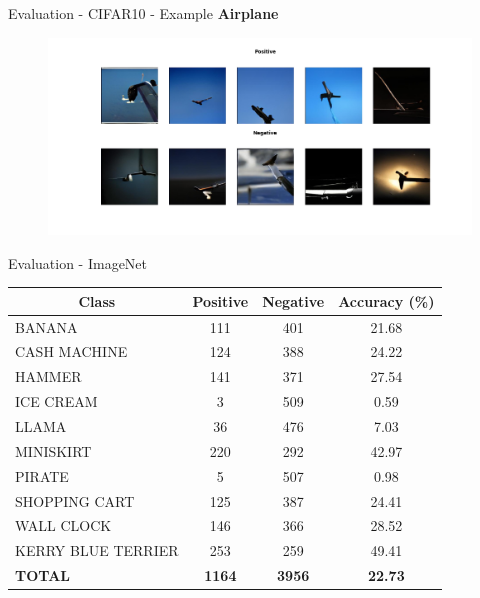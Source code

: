 \documentclass[t]{beamer}
\begin{document}
\begin{frame}[c]{Evaluation - CIFAR10 - Example}
\textbf{Airplane}
\begin{figure}
    \centering
    \includegraphics[scale=0.25]{airplane.png}
\end{figure} 
\end{frame}

\begin{frame}[c]{Evaluation - ImageNet}
\fontsize{9}{6}\selectfont
\begin{table}[h!]
\begin{tabular}{|l|c|c|c|}
\hline
\multicolumn{1}{|c|}{\textbf{Class}} & \textbf{Positive} & \textbf{Negative} & \textbf{Accuracy (\%)}       \\ \hline
BANANA                               & 111               & 401               & {\color[HTML]{000000} 21.68} \\ \hline
CASH MACHINE                         & 124               & 388               & 24.22                        \\ \hline
HAMMER                               & 141               & 371               & 27.54                        \\ \hline
ICE CREAM                            & 3                 & 509               & {\color[HTML]{FE0000} 0.59}  \\ \hline
LLAMA                                & 36                & 476               & {\color[HTML]{333333} 7.03}  \\ \hline
MINISKIRT                            & 220               & 292               & 42.97                        \\ \hline
PIRATE                               & 5                 & 507               & 0.98                         \\ \hline
SHOPPING CART                        & 125               & 387               & 24.41                        \\ \hline
WALL CLOCK                           & 146               & 366               & 28.52                        \\ \hline
KERRY BLUE TERRIER                   & 253               & 259               & {\color[HTML]{32CB00} 49.41} \\ \hline
\textbf{TOTAL}                       & \textbf{1164}     & \textbf{3956}     & \textbf{22.73}               \\ \hline
\end{tabular}
\end{table}
\end{frame}
\end{document}
